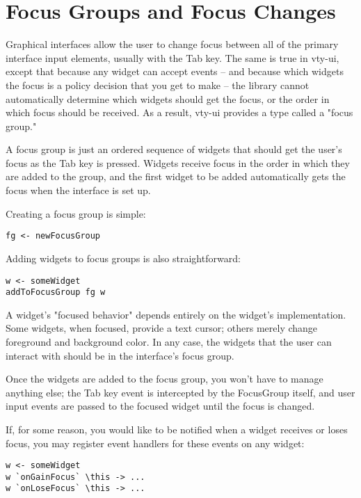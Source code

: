 \section{Focus Groups and Focus Changes}

Graphical interfaces allow the user to change focus between all of the
primary interface input elements, usually with the Tab key.  The same is
true in vty-ui, except that because any widget can accept events -- and
because which widgets the focus is a policy decision that you get to
make -- the library cannot automatically determine which widgets should
get the focus, or the order in which focus should be received.  As a
result, vty-ui provides a type called a "focus group."

A focus group is just an ordered sequence of widgets that should get the
user's focus as the Tab key is pressed.  Widgets receive focus in the
order in which they are added to the group, and the first widget to be
added automatically gets the focus when the interface is set up.

Creating a focus group is simple:

\begin{verbatim}
fg <- newFocusGroup
\end{verbatim}

Adding widgets to focus groups is also straightforward:

\begin{verbatim}
w <- someWidget
addToFocusGroup fg w
\end{verbatim}

A widget's "focused behavior" depends entirely on the widget's
implementation.  Some widgets, when focused, provide a text cursor;
others merely change foreground and background color.  In any case, the
widgets that the user can interact with should be in the interface's
focus group.

Once the widgets are added to the focus group, you won't have to manage
anything else; the Tab key event is intercepted by the FocusGroup
itself, and user input events are passed to the focused widget until the
focus is changed.

If, for some reason, you would like to be notified when a widget
receives or loses focus, you may register event handlers for these
events on any widget:

\begin{verbatim}
w <- someWidget
w `onGainFocus` \this -> ...
w `onLoseFocus` \this -> ...
\end{verbatim}

